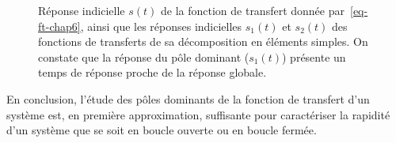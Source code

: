 \begin{figure}[!h]
\centering
\caption{Réponse indicielle $s(t)$ de la fonction de transfert donnée 
         par~\cref{eq-ft-chap6}, ainsi que les réponses indicielles
         $s_1(t)$ et $s_2(t)$ des fonctions de transferts de 
         sa décomposition en éléments simples. On constate que 
         la réponse du pôle dominant ($s_1(t)$) présente un temps de 
         réponse proche de la réponse globale.\label{fig-poles_dominants}}
\end{figure}

En conclusion, l'étude des pôles dominants de la fonction de transfert 
d'un système est, en première approximation, suffisante pour caractériser 
la rapidité d'un système que se soit en boucle ouverte ou en boucle fermée.



